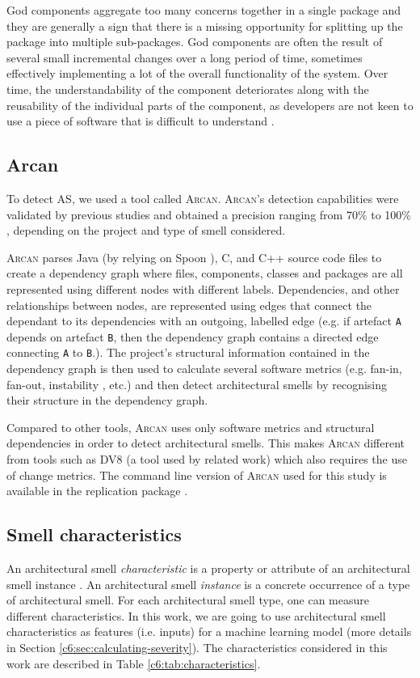 God components aggregate too many concerns together in a single package and they are generally a sign that there is a missing opportunity for splitting up the package into multiple sub-packages.
God components are often the result of several small incremental changes over a long period of time, sometimes effectively implementing a lot of the overall functionality of the system.
Over time, the understandability of the component deteriorates along with the reusability of the individual parts of the component, as developers are not keen to use a piece of software that is difficult to understand \cite{Lippert2006}.

\subsection{Arcan}
To detect AS, we used a tool called \textsc{Arcan}.
\textsc{Arcan}'s detection capabilities were validated by previous studies and obtained a precision ranging from 70\% to 100\% \cite{Arcelli2020, Arcelli2017}, depending on the project and type of smell considered.

\textsc{Arcan} parses Java (by relying on Spoon \cite{Pawlak2015}), C, and C++ source code files to create a dependency graph where files, components, classes and packages are all represented using different nodes with different labels. Dependencies, and other relationships between nodes, are represented using edges that connect the dependant to its dependencies with an outgoing, labelled edge (e.g. if artefact \texttt{A} depends on artefact \texttt{B}, then the dependency graph contains a directed edge connecting \texttt{A} to \texttt{B}.). 
The project's structural information contained in the dependency graph is then used to calculate several software metrics (e.g. fan-in, fan-out, instability \cite{Martin2018}, etc.) and then detect architectural smells by recognising their structure in the dependency graph.

Compared to other tools, \textsc{Arcan} uses only software metrics and structural dependencies in order to detect architectural smells. 
This makes \textsc{Arcan} different from tools such as DV8 \cite{Xiao2016} (a tool used by related work) which also requires the use of change metrics.
The command line version of \textsc{Arcan} used for this study is available in the replication package \cite{ReplicationPackageC6}.

\subsection{Smell characteristics}
An architectural smell \emph{characteristic} is a property or attribute of an architectural smell instance \cite{Sas2019}. 
An architectural smell \emph{instance} is a concrete occurrence of a type of architectural smell.
For each architectural smell type, one can measure different characteristics.
In this work, we are going to use architectural smell characteristics as features (i.e. inputs) for a machine learning model (more details in Section \ref{c6:sec:calculating-severity}).
The characteristics considered in this work are described in Table \ref{c6:tab:characteristics}.

